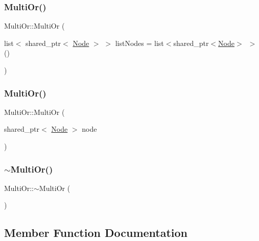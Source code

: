 \subsubsection{\texorpdfstring{Multi\+Or()}{MultiOr()}\hspace{0.1cm}{\footnotesize\ttfamily [1/2]}}
{\footnotesize\ttfamily Multi\+Or\+::\+Multi\+Or (\begin{DoxyParamCaption}\item[{list$<$ shared\+\_\+ptr$<$ \hyperlink{class_node}{Node} $>$ $>$}]{list\+Nodes = {\ttfamily list$<$shared\+\_\+ptr$<$\hyperlink{class_node}{Node}$>$~$>$()} }\end{DoxyParamCaption})\hspace{0.3cm}{\ttfamily [explicit]}}

\mbox{\label{class_multi_or_a17ce7a33d4fe548dca2db45a59202057}} 
\subsubsection{\texorpdfstring{Multi\+Or()}{MultiOr()}\hspace{0.1cm}{\footnotesize\ttfamily [2/2]}}
{\footnotesize\ttfamily Multi\+Or\+::\+Multi\+Or (\begin{DoxyParamCaption}\item[{shared\+\_\+ptr$<$ \hyperlink{class_node}{Node} $>$}]{node }\end{DoxyParamCaption})\hspace{0.3cm}{\ttfamily [explicit]}}

\mbox{\label{class_multi_or_a4f0161febe9e9fe9d4fc44708369de51}} 
\subsubsection{\texorpdfstring{$\sim$\+Multi\+Or()}{~MultiOr()}}
{\footnotesize\ttfamily Multi\+Or\+::$\sim$\+Multi\+Or (\begin{DoxyParamCaption}{ }\end{DoxyParamCaption})\hspace{0.3cm}{\ttfamily [override]}}



\subsection{Member Function Documentation}
\mbox{\label{class_multi_or_a9a81647d40f86c825fdb1513f1b3f30c}} 

